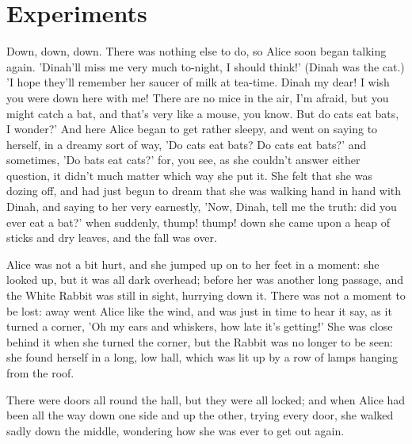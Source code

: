 \section{Experiments}
\label{sec-experiments}


Down, down, down.
There was nothing else to do, so Alice soon began talking again.
'Dinah'll miss me very much to-night, I should think!'
(Dinah was the cat.)
'I hope they'll remember her saucer of milk at tea-time.
Dinah my dear!
I wish you were down here with me!
There are no mice in the air, I'm afraid, but you might catch a bat,
and that's very like a mouse, you know.
But do cats eat bats, I wonder?'
And here Alice began to get rather sleepy, and went on saying to
herself, in a dreamy sort of way, 'Do cats eat bats?
Do cats eat bats?'
and sometimes, 'Do bats eat cats?'
for, you see, as she couldn't answer either question, it didn't much
matter which way she put it.
She felt that she was dozing off, and had just begun to dream that
she was walking hand in hand with Dinah, and saying to her very
earnestly, 'Now, Dinah, tell me the truth: did you ever eat a bat?'
when suddenly, thump!
thump!
down she came upon a heap of sticks and dry leaves, and the fall was
over.

Alice was not a bit hurt, and she jumped up on to her feet in a
moment: she looked up, but it was all dark overhead; before her was
another long passage, and the White Rabbit was still in sight,
hurrying down it.
There was not a moment to be lost: away went Alice like the wind, and
was just in time to hear it say, as it turned a corner, 'Oh my ears
and whiskers, how late it's getting!'
She was close behind it when she turned the corner, but the Rabbit
was no longer to be seen: she found herself in a long, low hall,
which was lit up by a row of lamps hanging from the roof.

There were doors all round the hall, but they were all locked; and
when Alice had been all the way down one side and up the other,
trying every door, she walked sadly down the middle, wondering how
she was ever to get out again.
